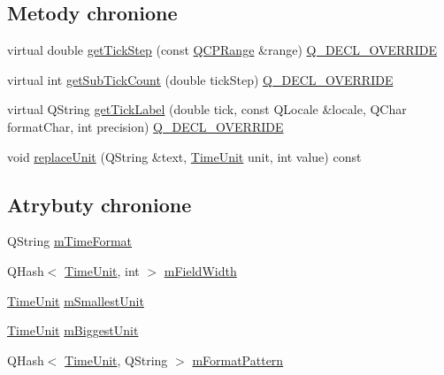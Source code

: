 \subsection*{Metody chronione}
\begin{DoxyCompactItemize}
\item 
virtual double \hyperlink{class_q_c_p_axis_ticker_time_a5615064642090fe193797caea8b98cb4}{get\+Tick\+Step} (const \hyperlink{class_q_c_p_range}{Q\+C\+P\+Range} \&range) \hyperlink{qcustomplot_8hh_a42cc5eaeb25b85f8b52d2a4b94c56f55}{Q\+\_\+\+D\+E\+C\+L\+\_\+\+O\+V\+E\+R\+R\+I\+DE}
\item 
virtual int \hyperlink{class_q_c_p_axis_ticker_time_acace84c46598176aa53837e147595471}{get\+Sub\+Tick\+Count} (double tick\+Step) \hyperlink{qcustomplot_8hh_a42cc5eaeb25b85f8b52d2a4b94c56f55}{Q\+\_\+\+D\+E\+C\+L\+\_\+\+O\+V\+E\+R\+R\+I\+DE}
\item 
virtual Q\+String \hyperlink{class_q_c_p_axis_ticker_time_a046eb771bdf2a959f570db542b3a0be6}{get\+Tick\+Label} (double tick, const Q\+Locale \&locale, Q\+Char format\+Char, int precision) \hyperlink{qcustomplot_8hh_a42cc5eaeb25b85f8b52d2a4b94c56f55}{Q\+\_\+\+D\+E\+C\+L\+\_\+\+O\+V\+E\+R\+R\+I\+DE}
\item 
void \hyperlink{class_q_c_p_axis_ticker_time_a71896eb1fd7eafaba911245c048857e1}{replace\+Unit} (Q\+String \&text, \hyperlink{class_q_c_p_axis_ticker_time_a5c48ded8c6d3a1aca9b68219469fea3e}{Time\+Unit} unit, int value) const 
\end{DoxyCompactItemize}
\subsection*{Atrybuty chronione}
\begin{DoxyCompactItemize}
\item 
Q\+String \hyperlink{class_q_c_p_axis_ticker_time_a800af3fe0a7c1a8110c043b82169bc9d}{m\+Time\+Format}
\item 
Q\+Hash$<$ \hyperlink{class_q_c_p_axis_ticker_time_a5c48ded8c6d3a1aca9b68219469fea3e}{Time\+Unit}, int $>$ \hyperlink{class_q_c_p_axis_ticker_time_a58305b56f847bcab8b3c852a21bdb91a}{m\+Field\+Width}
\item 
\hyperlink{class_q_c_p_axis_ticker_time_a5c48ded8c6d3a1aca9b68219469fea3e}{Time\+Unit} \hyperlink{class_q_c_p_axis_ticker_time_a61033c493cec76a69628d1aaa5b07abf}{m\+Smallest\+Unit}
\item 
\hyperlink{class_q_c_p_axis_ticker_time_a5c48ded8c6d3a1aca9b68219469fea3e}{Time\+Unit} \hyperlink{class_q_c_p_axis_ticker_time_a349b2debe07adc591996aa73dec9a757}{m\+Biggest\+Unit}
\item 
Q\+Hash$<$ \hyperlink{class_q_c_p_axis_ticker_time_a5c48ded8c6d3a1aca9b68219469fea3e}{Time\+Unit}, Q\+String $>$ \hyperlink{class_q_c_p_axis_ticker_time_adfc8221afbccb99343aa61f75419908d}{m\+Format\+Pattern}
\end{DoxyCompactItemize}


